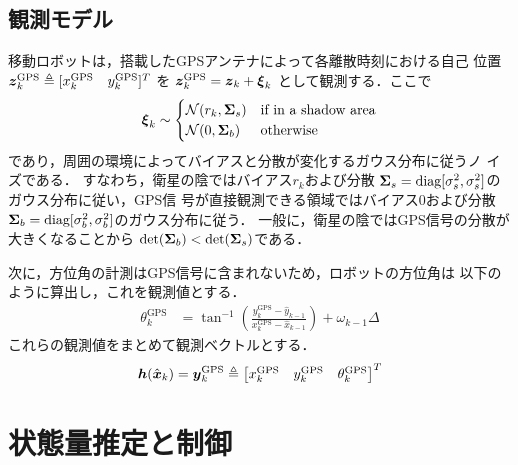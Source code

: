 \documentclass[a4paper,10pt,twocolumn,fleqn]{jsarticle}
\def\vec#1{\mbox{\boldmath$#1$}}
\def\vec#1{\mbox{\boldmath$#1$}}
\begin{document}
\subsection{観測モデル}
\vspace{-2mm}
移動ロボットは，搭載したGPSアンテナによって各離散時刻における自己
位置
$\vec{z}^{\text{GPS}}_{k}\triangleq
[\begin{matrix}
  x^{\text{GPS}}_k &
  y^{\text{GPS}}_k 
 \end{matrix}]^T$
を
$
 \vec{z}^{\text{GPS}}_k = \vec{z}_k +  \vec{\xi}_k
 \label{eqn:zgps}
$
として観測する．ここで
\begin{align}
 \vec{\xi}_k\sim 
 \begin{cases}
 \mathcal{N}(r_k,\vec{\Sigma}_s)  & \text{if in a shadow area} \\
 \mathcal{N}(0,  \vec{\Sigma}_b)  & \text{otherwise} 
 \end{cases}
 \label{eqn:www}
\end{align}
であり，周囲の環境によってバイアスと分散が変化するガウス分布に従うノ
イズである．
%
すなわち，衛星の陰ではバイアス$r_k$および分散
$\vec{\Sigma}_s=\text{diag}[\sigma_s^2, \sigma_s^2]$のガウス分布に従い，GPS信
号が直接観測できる領域ではバイアス0および分散
$\vec{\Sigma}_b=\text{diag}[\sigma_b^2, \sigma_b^2]$のガウス分布に従う．
一般に，衛星の陰ではGPS信号の分散が大きくなることから
$
\text{det}(\vec{\Sigma}_b)<\text{det}(\vec{\Sigma}_s)
$である．

次に，方位角の計測はGPS信号に含まれないため，ロボットの方位角は
以下のように算出し，これを観測値とする．
\begin{align}
\theta^{\text{GPS}}_k
 &=\tan^{-1}\left(
\frac{y^{\text{GPS}}_{k}-\hat{y}_{k-1}}{x^{\text{GPS}}_{k}-\hat{x}_{k-1}}
 \right)+\omega_{k-1}\Delta
\end{align}
これらの観測値をまとめて観測ベクトルとする．
\begin{align}
 \vec{h}(\hat{\vec{x}}_k)=
 \vec{y}_k^{\text{GPS}}\triangleq
 \left[
 \begin{matrix}
  x_k^{\text{GPS}} &y_k^{\text{GPS}} &\theta_k^{\text{GPS}} 
 \end{matrix}
 \right]^T
\end{align}
\vspace{-10mm}
\section{状態量推定と制御\label{sec:cntl}}
\vspace{-2mm}
\end{document}

